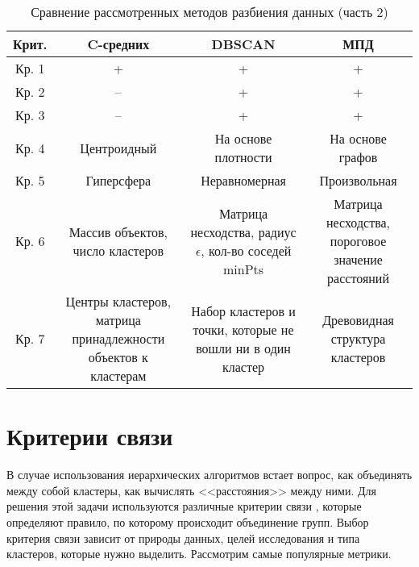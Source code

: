 \begin{table}[H]
    \centering
	\caption{Сравнение рассмотренных методов разбиения данных (часть 2)}
    \label{tbl:compare_clustering2}
	\begin{tabular}{|c|c|c|c|}
        \hline
        \textbf{Крит.} & \textbf{C-средних} & \textbf{DBSCAN} & \textbf{МПД}
        \\ \hline

        Кр. 1 & + & + & + \\ \hline
        Кр. 2 & -- & + & + \\ \hline
        Кр. 3 & -- & + & + \\ \hline
        Кр. 4 & Центроидный & На основе плотности & На основе графов \\ \hline
        Кр. 5 & Гиперсфера & Неравномерная & Произвольная \\ \hline
        Кр. 6 & \begin{minipage}[t]{4.7cm}\centering Массив объектов, число кластеров\end{minipage} 
              & \begin{minipage}[t]{4.7cm}\centering Матрица несходства, радиус $\epsilon$, кол-во соседей minPts\end{minipage} 
              & \begin{minipage}[t]{4.6cm}\centering Матрица несходства, пороговое значение расстояний\end{minipage} 
            \\ \hline
        Кр. 7 & \begin{minipage}[t]{4.7cm}\centering Центры кластеров, матрица принадлежности объектов к кластерам\end{minipage} 
              & \begin{minipage}[t]{4.7cm}\centering Набор кластеров и точки, которые не вошли ни в один кластер\end{minipage} 
              & \begin{minipage}[t]{4.6cm}\centering Древовидная структура кластеров\end{minipage} 
            \\ \hline
    \end{tabular}
\end{table}


\section{Критерии связи}

В случае использования иерархических алгоритмов встает вопрос, как объединять между собой кластеры, как вычислять <<расстояния>> между ними. Для решения этой задачи используются различные критерии связи \cite{Links}, которые определяют правило, по которому происходит объединение групп. Выбор критерия связи зависит от природы данных, целей исследования и типа кластеров, которые нужно выделить. Рассмотрим самые популярные метрики.

